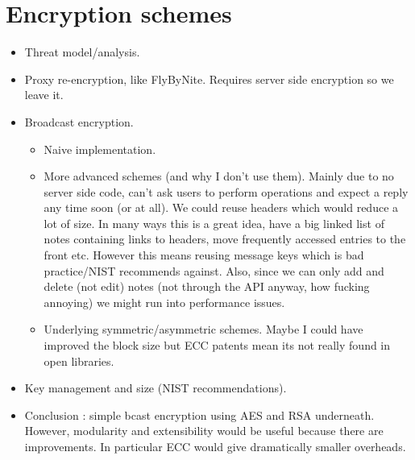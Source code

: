 \section{Encryption schemes}
    \begin{itemize}
        \item Threat model/analysis.
        \item Proxy re-encryption, like FlyByNite. Requires server side encryption so we leave it.
        \item Broadcast encryption.
        \begin{itemize}
            \item Naive implementation.
            \item More advanced schemes (and why I don't use them). Mainly due to no server side code, can't ask users to perform operations and expect a reply any time soon (or at all). We could reuse headers which would reduce a lot of size. In many ways this is a great idea, have a big linked list of notes containing links to headers, move frequently accessed entries to the front etc. However this means reusing message keys which is bad practice/NIST recommends against. Also, since we can only add and delete (not edit) notes (not through the API anyway, how fucking annoying) we might run into performance issues. 
            \item Underlying symmetric/asymmetric schemes. Maybe I could have improved the block size but ECC patents mean its not really found in open libraries.
        \end{itemize}
	\item Key management and size (NIST recommendations).
        \item Conclusion : simple bcast encryption using AES and RSA underneath. However, modularity and extensibility would be useful because there are improvements. In particular ECC would give dramatically smaller overheads. 
    \end{itemize}

